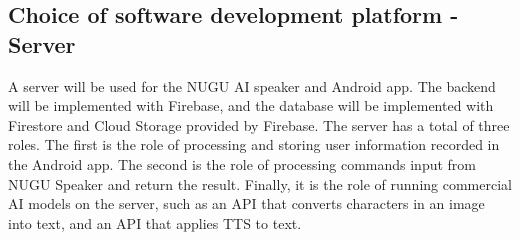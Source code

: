 \documentclass[conference]{IEEEtran}
\begin{document}
\subsection{Choice of software development platform - Server} 

A server will be used for the NUGU AI speaker and Android app. The backend will be implemented with Firebase, and the database will be implemented with Firestore and Cloud Storage provided by Firebase. The server has a total of three roles. The first is the role of processing and storing user information recorded in the Android app. The second is the role of processing commands input from NUGU Speaker and return the result. Finally, it is the role of running commercial AI models on the server, such as an API that converts characters in an image into text, and an API that applies TTS to text.
\end{document}
